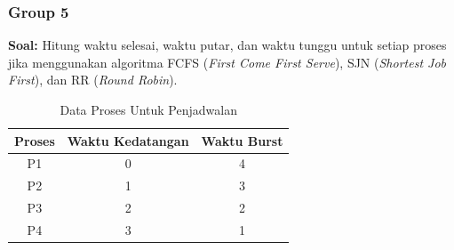 \documentclass[12pt]{article}
\begin{document}
\subsubsection{Group 5}
\textbf{Soal:}
Hitung waktu selesai, waktu putar, dan waktu tunggu untuk setiap proses jika menggunakan algoritma FCFS (\textit{First Come First Serve}), SJN (\textit{Shortest Job First}), dan RR (\textit{Round Robin}).
    \begin{table}[h] %
        \centering
        \begin{tabular}{|c|c|c|} %
        \hline
        Proses & Waktu Kedatangan & Waktu Burst \\ %
        \hline
        P1 & 0 & 4 \\ %
        \hline
        P2 & 1 & 3 \\ %
        \hline
        P3 & 2 & 2 \\
        \hline
        P4 & 3 & 1 \\
        \hline
        \end{tabular}
        \caption{Data Proses Untuk Penjadwalan} %
        \label{tab:Data Proses Untuk Penjadwalan} %
    \end{table}
\end{document}
